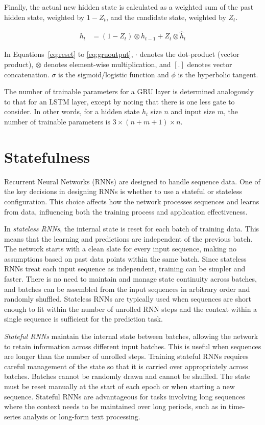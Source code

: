Finally, the actual new hidden state is calculated as a weighted sum of the past hidden state, weighted by $1-Z_t$, and the candidate state, weighted by $Z_t$.

\begin{align}
h_t &= (1 - Z_t) \otimes h_{t-1} + Z_t \otimes \hat{h}_t \label{eq:gruoutput}
\end{align}

In Equations~\ref{eq:reset} to \ref{eq:gruoutput}, $\cdot$ denotes the dot-product (vector product), $\otimes$ denotes element-wise multiplication, and $[.]$ denotes vector concatenation.  $\sigma$ is the sigmoid/logistic function and $\phi$ is the hyperbolic tangent.

The number of trainable parameters for a GRU layer is determined analogously to that for an LSTM layer, except by noting that there is one less gate to consider. In other words, for a hidden state $h_t$ size $n$ and input size $m$, the number of trainable parameters is $3 \times (n+m+1) \times n$.

\section{Statefulness}

Recurrent Neural Networks (RNNs) are designed to handle sequence data. One of the key decisions in designing RNNs is whether to use a stateful or stateless configuration. This choice affects how the network processes sequences and learns from data, influencing both the training process and application effectiveness.

In \emph{stateless RNNs}, the internal state is reset for each batch of training data. This means that the learning and predictions are independent of the previous batch. The network starts with a clean slate for every input sequence, making no assumptions based on past data points within the same batch. Since stateless RNNs treat each input sequence as independent, training can be simpler and faster. There is no need to maintain and manage state continuity across batches, and batches can be assembled from the input sequences in arbitrary order and randomly shuffled. Stateless RNNs are typically used when sequences are short enough to fit within the number of unrolled RNN steps and the context within a single sequence is sufficient for the prediction task.

\emph{Stateful RNNs} maintain the internal state between batches, allowing the network to retain information across different input batches. This is useful when sequences are longer than the number of unrolled steps. Training stateful RNNs requires careful management of the state so that it is carried over appropriately across batches. Batches cannot be randomly drawn and cannot be shuffled. The state must be reset manually at the start of each epoch or when starting a new sequence. Stateful RNNs are advantageous for tasks involving long sequences where the context needs to be maintained over long periods, such as in time-series analysis or long-form text processing.


